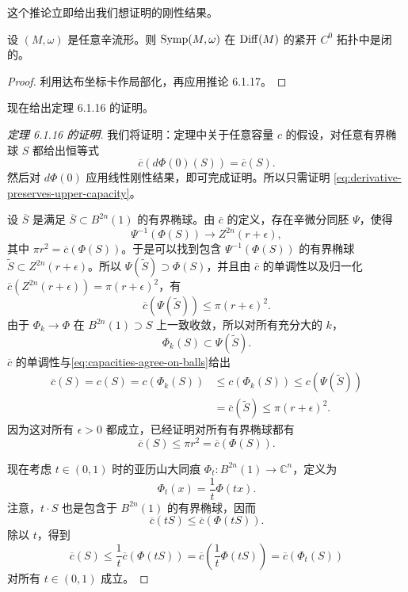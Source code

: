 这个推论立即给出我们想证明的刚性结果。

\begin{theorem}\label{thm:symp-closed-compact-open}
设 $(M,\omega)$ 是任意辛流形。则 $\operatorname{Symp}(M,\omega)$ 在
$\operatorname{Diff}(M)$ 的紧开 $C^0$ 拓扑中是闭的。
\end{theorem}

\begin{proof}
利用达布坐标卡作局部化，再应用推论 6.1.17。
\end{proof}

现在给出定理 6.1.16 的证明。

\begin{proof}[定理 6.1.16 的证明]
我们将证明：定理中关于任意容量 $c$ 的假设，对任意有界椭球 $S$ 都给出恒等式
\begin{equation}
 \overline c(d\Phi(0)(S))=\overline c(S).
 \label{eq:derivative-preserves-upper-capacity}
\end{equation}
然后对 $d\Phi(0)$ 应用线性刚性结果，即可完成证明。所以只需证明
\eqref{eq:derivative-preserves-upper-capacity}。

设 $\overline S$ 是满足 $\overline S\subset B^{2n}(1)$ 的有界椭球。由
$\overline c$ 的定义，存在辛微分同胚 $\Psi$，使得
\[
 \Psi^{-1}(\Phi(S))\longrightarrow Z^{2n}(r+\epsilon),
\]
其中 $\pi r^2=\overline c(\Phi(S))$。于是可以找到包含
$\Psi^{-1}(\Phi(S))$ 的有界椭球
$\widetilde S\subset Z^{2n}(r+\epsilon)$。所以
$\Psi(\widetilde S)\supset\Phi(S)$，并且由 $\overline c$ 的单调性以及归一化
$\overline c(Z^{2n}(r+\epsilon))=\pi(r+\epsilon)^2$，有
\[
 \overline c(\Psi(\widetilde S))\leq\pi(r+\epsilon)^2.
\]
由于 $\Phi_k\to\Phi$ 在 $B^{2n}(1)\supset S$ 上一致收敛，所以对所有充分大的 $k$，
\[
 \Phi_k(S)\subset\Psi(\widetilde S).
\]
$\overline c$ 的单调性与\eqref{eq:capacities-agree-on-balls}给出
\[
\begin{aligned}
 \overline c(S)=c(S)=c(\Phi_k(S))
 &\leq c(\Phi_k(S))
 \leq c(\Psi(\widetilde S))\\
 &=\overline c(\widetilde S)
 \leq\pi(r+\epsilon)^2.
\end{aligned}
\]
因为这对所有 $\epsilon>0$ 都成立，已经证明对所有有界椭球都有
\[
 \overline c(S)\leq\pi r^2=\overline c(\Phi(S)).
\]

现在考虑 $t\in(0,1)$ 时的亚历山大同痕
$\Phi_t:B^{2n}(1)\to\mathbb C^n$，定义为
\[
 \Phi_t(x)=\frac1t\Phi(tx).
\]
注意，$t\cdot S$ 也是包含于 $B^{2n}(1)$ 的有界椭球，因而
\[
 \overline c(tS)\leq\overline c(\Phi(tS)).
\]
除以 $t$，得到
\begin{equation}
 \overline c(S)
 \leq\frac1t\overline c(\Phi(tS))
 =\overline c\left(\frac1t\Phi(tS)\right)
 =\overline c(\Phi_t(S))
 \label{eq:alexander-isotopy-capacity-bound}
\end{equation}
对所有 $t\in(0,1)$ 成立。


\end{proof}
